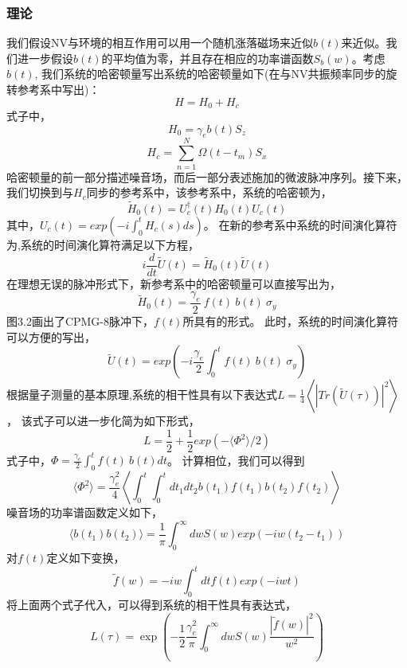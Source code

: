\subsubsection{理论}
我们假设NV与环境的相互作用可以用一个随机涨落磁场来近似$b(t)$来近似。我们进一步假设$b(t)$的平均值为零，并且存在相应的功率谱函数$S_b(w)$。考虑$b(t)$, 我们系统的哈密顿量写出系统的哈密顿量如下(在与NV共振频率同步的旋转参考系中写出)：
\begin{equation}
    H=H_0+H_c
\end{equation}
式子中，
\begin{equation}
H_0=\gamma_{e} b(t) S_z
\end{equation}
\begin{equation}
 H_c=\sum\limits_{n=1}^N \Omega(t-t_m) S_x
\end{equation}
哈密顿量的前一部分描述噪音场，而后一部分表述施加的微波脉冲序列。接下来，我们切换到与$H_c$同步的参考系中，该参考系中，系统的哈密顿为，
\begin{equation}
    \widetilde{H}_0(t)=U_c^\dagger(t)H_0(t)U_c(t)
\end{equation}
其中，$U_c(t)=exp(-\num{i}\int_0^t H_c(s) d s)$。
在新的参考系中系统的时间演化算符为,系统的时间演化算符满足以下方程，
\begin{equation}
    i\frac{d}{dt}\widetilde{U}(t)=\widetilde{H}_0(t)\widetilde{U}(t)
\end{equation}
在理想无误的脉冲形式下，新参考系中的哈密顿量可以直接写出为，
\begin{equation}
    \widetilde{H}_0(t)=\frac{\gamma_{e}}{2}\ f(t)\ b(t)\ \sigma_y
\end{equation}
图3.2画出了CPMG-8脉冲下，$f(t)$所具有的形式。
此时，系统的时间演化算符可以方便的写出，
\begin{equation}
    \widetilde{U}(t)=exp\left (-\num{i}\frac{\gamma_{e}}{2} \int_0^t f(t)\ b(t)\ \sigma_y \right )
\end{equation}
根据量子测量的基本原理,系统的相干性具有以下表达式$L=\frac{1}{4}\left \langle |Tr(\widetilde{U}(\tau))|^2  \right \rangle$，
该式子可以进一步化简为如下形式，
\begin{equation}
    L=\frac{1}{2}+\frac{1}{2}exp(-\langle \Phi^2 \rangle /2)
\end{equation}
式子中，$\Phi=\frac{\gamma_{e}}{2}\int_0^t f(t)\ b(t) dt$。
计算相位，我们可以得到
\begin{equation}
    \langle \Phi^2 \rangle=\frac{\gamma_{e}^2}{4} \left \langle \int_0^t \int_0^t dt_1 dt_2 b(t_1)f(t_1) b(t_2) f(t_2) \right \rangle
\end{equation}
噪音场的功率谱函数定义如下，
\begin{equation}
    \langle b(t_1)b(t_2) \rangle=\frac{1}{\pi}\int_0^\infty dw S(w) exp(-\num{i} w (t_2-t_1))
\end{equation}
对$f(t)$定义如下变换，
\begin{equation}
    \widetilde{f}(w)=-\num{i} w \int_0^t dt f(t) exp(-\num{i}wt)
\end{equation}
将上面两个式子代入，可以得到系统的相干性具有表达式，
\begin{equation}
    L(\tau)=\exp\left (-\frac{1}{2} \frac{\gamma_{e}^2}{\pi} \int_0^\infty dw S(w) \frac{|\widetilde{f}(w)|^2}{w^2} \right )
\end{equation}
